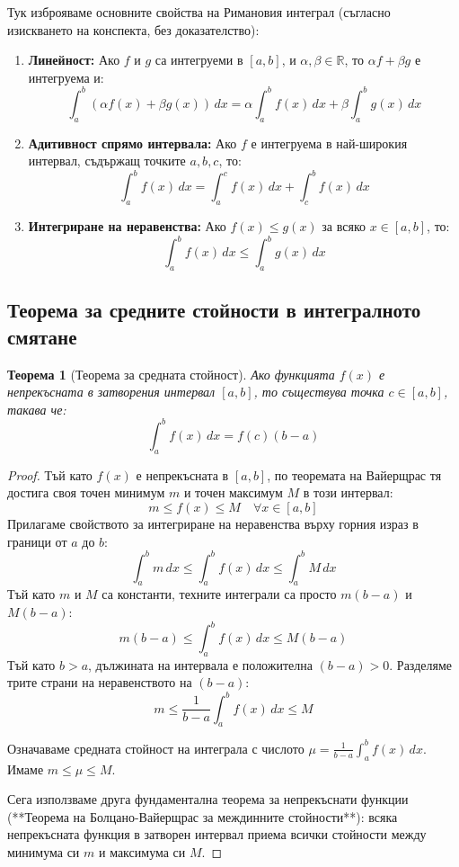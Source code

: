 \documentclass{scrartcl}
\newtheorem{theorem}{Теорема}
\begin{document}
\begin{FlushLeft}
Тук изброяваме основните свойства на Римановия интеграл (съгласно изискването на конспекта, без доказателство):
\begin{enumerate}
    \item \textbf{Линейност:} Ако $f$ и $g$ са интегруеми в $[a, b]$, и $\alpha, \beta \in \mathbb{R}$, то $\alpha f + \beta g$ е интегруема и:
    \[ \int_{a}^{b} (\alpha f(x) + \beta g(x))\,dx = \alpha \int_{a}^{b} f(x)\,dx + \beta \int_{a}^{b} g(x)\,dx \]
    \item \textbf{Адитивност спрямо интервала:} Ако $f$ е интегруема в най-широкия интервал, съдържащ точките $a, b, c$, то:
    \[ \int_{a}^{b} f(x)\,dx = \int_{a}^{c} f(x)\,dx + \int_{c}^{b} f(x)\,dx \]
    \item \textbf{Интегриране на неравенства:} Ако $f(x) \le g(x)$ за всяко $x \in [a, b]$, то:
    \[ \int_{a}^{b} f(x)\,dx \le \int_{a}^{b} g(x)\,dx \]
\end{enumerate}

\subsection{Теорема за средните стойности в интегралното смятане}

\begin{theorem}[Теорема за средната стойност]
Ако функцията $f(x)$ е непрекъсната в затворения интервал $[a, b]$, то съществува точка $c \in [a, b]$, такава че:
\[ \int_{a}^{b} f(x)\,dx = f(c)(b - a) \]
\end{theorem}

\begin{proof}
Тъй като $f(x)$ е непрекъсната в $[a, b]$, по теоремата на Вайерщрас тя достига своя точен минимум $m$ и точен максимум $M$ в този интервал:
\[ m \le f(x) \le M \quad \forall x \in [a, b] \]
Прилагаме свойството за интегриране на неравенства върху горния израз в граници от $a$ до $b$:
\[ \int_{a}^{b} m\,dx \le \int_{a}^{b} f(x)\,dx \le \int_{a}^{b} M\,dx \]
Тъй като $m$ и $M$ са константи, техните интеграли са просто $m(b-a)$ и $M(b-a)$:
\[ m(b - a) \le \int_{a}^{b} f(x)\,dx \le M(b - a) \]
Тъй като $b > a$, дължината на интервала е положителна $(b - a) > 0$. Разделяме трите страни на неравенството на $(b - a)$:
\[ m \le \frac{1}{b - a}\int_{a}^{b} f(x)\,dx \le M \]

Означаваме средната стойност на интеграла с числото $\mu = \frac{1}{b - a}\int_{a}^{b} f(x)\,dx$. Имаме $m \le \mu \le M$.

Сега използваме друга фундаментална теорема за непрекъснати функции (**Теорема на Болцано-Вайерщрас за междинните стойности**): всяка непрекъсната функция в затворен интервал приема всички стойности между минимума си $m$ и максимума си $M$. 


\end{proof}
\end{FlushLeft}
\end{document}
